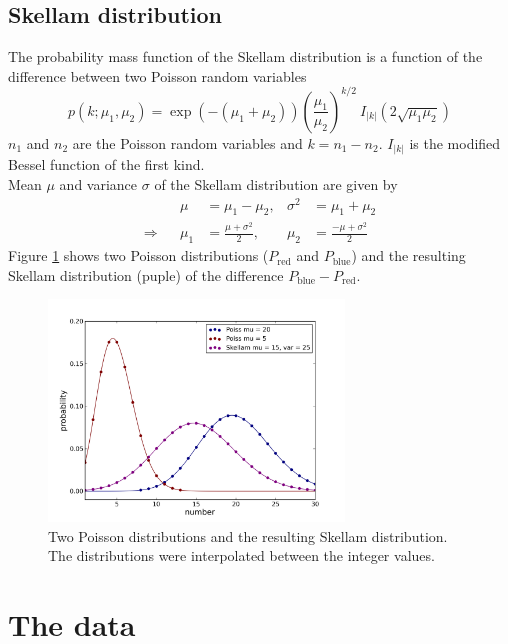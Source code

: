 \subsection{Skellam distribution}
The probability
mass function of the Skellam distribution is a function of the difference between
two Poisson random variables
\begin{equation}
	p(k;\mu_1, \mu_2) =
	\exp(-(\mu_1+\mu_2))\left(\frac{\mu_1}{\mu_2}\right)^{k/2}~I_{|k|}\left(2\sqrt{\mu_1
	\mu_2}\right)
\end{equation}  
$n_1$ and $n_2$ are the Poisson random variables and $k = n_1 - n_2$.
$I_{|k|}$ is the modified Bessel function of the first kind.\\
Mean $\mu$ and variance $\sigma$ of the Skellam distribution are given by
\begin{align}
	&&\mu &= \mu_1 - \mu_2,& \sigma^2 &= \mu_1 + \mu_2\\
	\Rightarrow &&\mu_1& = \frac{\mu + \sigma^2}{2},& \mu_2 &=\frac{-\mu +
	\sigma^2}{2}
\end{align}
Figure \ref{skellamdist} shows two Poisson distributions ($P_\text{red}$ and $P_\text{blue}$) and the resulting Skellam distribution (puple) of the difference $P_\text{blue} - P_\text{red}$.
\begin{figure}
\centering
\includegraphics[width = 0.7\textwidth]{pictures/skellamdist.png}
	\caption{Two Poisson distributions and the resulting Skellam distribution. The distributions were interpolated between the integer values.}
	\label{skellamdist}
\end{figure}



\section{The data}
